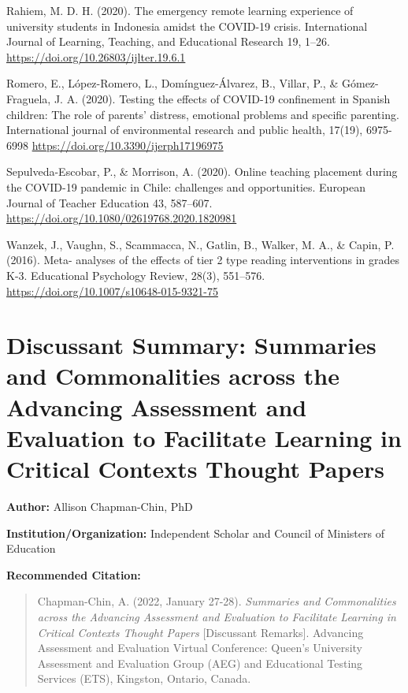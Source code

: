 \documentclass[
]{book}
\begin{document}
Rahiem, M. D. H. (2020). The emergency remote learning experience of university students in Indonesia amidst the COVID-19 crisis. International Journal of Learning, Teaching, and Educational Research 19, 1--26. \url{https://doi.org/10.26803/ijlter.19.6.1}

Romero, E., López-Romero, L., Domínguez-Álvarez, B., Villar, P., \& Gómez-Fraguela, J. A. (2020). Testing the effects of COVID-19 confinement in Spanish children: The role of parents' distress, emotional problems and specific parenting. International journal of environmental research and public health, 17(19), 6975-6998 \url{https://doi.org/10.3390/ijerph17196975}

Sepulveda-Escobar, P., \& Morrison, A. (2020). Online teaching placement during the COVID-19 pandemic in Chile: challenges and opportunities. European Journal of Teacher Education 43, 587--607. \url{https://doi.org/10.1080/02619768.2020.1820981}

Wanzek, J., Vaughn, S., Scammacca, N., Gatlin, B., Walker, M. A., \& Capin, P. (2016). Meta- analyses of the effects of tier 2 type reading interventions in grades K-3. Educational Psychology Review, 28(3), 551--576. \url{https://doi.org/10.1007/s10648-015-9321-75}

\newpage

\hypertarget{discussant-summary-summaries-and-commonalities-across-the-advancing-assessment-and-evaluation-to-facilitate-learning-in-critical-contexts-thought-papers}{%
\section{Discussant Summary: Summaries and Commonalities across the Advancing Assessment and Evaluation to Facilitate Learning in Critical Contexts Thought Papers}\label{discussant-summary-summaries-and-commonalities-across-the-advancing-assessment-and-evaluation-to-facilitate-learning-in-critical-contexts-thought-papers}}

\textbf{Author:} Allison Chapman-Chin, PhD

\textbf{Institution/Organization:} Independent Scholar and Council of Ministers of Education

\textbf{Recommended Citation:}

\begin{quote}
Chapman-Chin, A. (2022, January 27-28). \emph{Summaries and Commonalities across the Advancing Assessment and Evaluation to Facilitate Learning in Critical Contexts Thought Papers} {[}Discussant Remarks{]}. Advancing Assessment and Evaluation Virtual Conference: Queen's University Assessment and Evaluation Group (AEG) and Educational Testing Services (ETS), Kingston, Ontario, Canada.
\end{quote}
\end{document}
